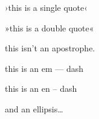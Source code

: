 
\def\mytitle{MultiMarkdown German Guillemets Test}

›this is a single quote‹

»this is a double quote«

this isn't an apostrophe.

this is an em --- dash

this is an en -- dash

and an ellipsis{\ldots}




